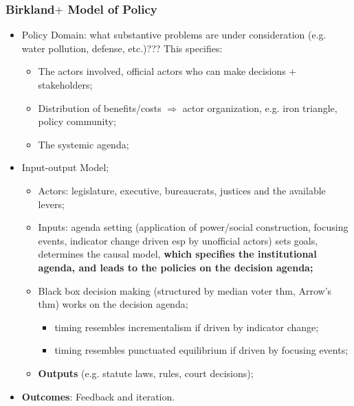 \documentclass[aspectratio=169]{beamer}
\theoremstyle{principle}
\begin{document}
\begin{frame}
\frametitle{Birkland$+$ Model of Policy}
\begin{itemize}
\item Policy Domain: what substantive problems are under consideration (e.g. water pollution, defense, etc.)???  This specifies:
\begin{itemize}
\item The actors involved, official actors who can make decisions $+$ stakeholders; 
\item Distribution of benefits/costs $\Rightarrow$ actor organization, e.g. iron triangle, policy community;
\item The systemic agenda; 
\end{itemize}
\bigskip
\item \color{black}Input-output Model;
\begin{itemize}
\item Actors: legislature, executive, bureaucrats, justices and the available levers;
\item Inputs: agenda setting (application of power/social construction, focusing events, indicator change driven esp by unofficial actors) sets goals, determines the causal model, \textbf{which specifies the institutional agenda, and leads to the policies on the decision agenda;}
\item Black box decision making (structured by median voter thm, Arrow's thm) works on the decision agenda;
\begin{itemize}
\item timing resembles incrementalism if driven by indicator change;
\item timing resembles punctuated equilibrium if driven by focusing events;
 \end{itemize}
\item \textbf{Outputs} (e.g. statute laws, rules, court decisions);
\end{itemize}
\bigskip
\item \textbf{Outcomes}: Feedback and iteration.
\end{itemize}
\end{frame}
\end{document}
